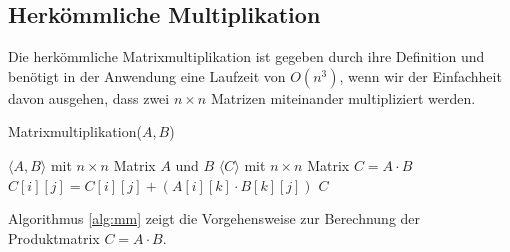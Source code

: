 \documentclass[oneside]{scrbook}
\numberwithin{equation}{section}
\begin{document}
\subsection{Herkömmliche Multiplikation}
Die herkömmliche Matrixmultiplikation ist gegeben durch ihre Definition und benötigt in der Anwendung eine Laufzeit von $O(n^3)$, wenn wir der Einfachheit davon ausgehen, dass zwei $n \times n$ Matrizen miteinander multipliziert werden.
\begin{algorithm}
	\caption{Matrixmultiplikation($A, B$)}
	\label{alg:mm}
	\begin{algorithmic}[1]
		\Require $\langle A, B\rangle$ mit $n \times n$ Matrix $A$ und $B$
		\Ensure $\langle C\rangle$ mit $n \times n$ Matrix $C = A \cdot B$
		\State $C[i][j] = C[i][j] + (A[i][k] \cdot B[k][j])$
		\EndFor
		\EndFor
		\EndFor
		\State \Return $C$
	\end{algorithmic}
\end{algorithm}
Algorithmus \ref{alg:mm} zeigt die Vorgehensweise zur Berechnung der Produktmatrix $C = A \cdot B$.
\end{document}
